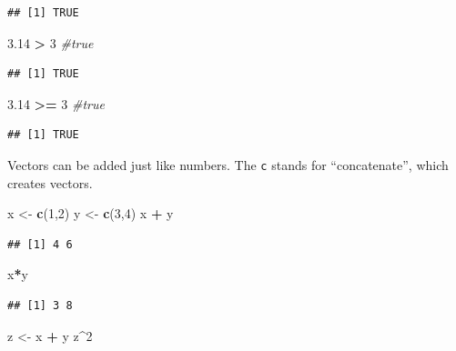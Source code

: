 \documentclass[openany]{book}
\newenvironment{Shaded}{\begin{snugshade}}{\end{snugshade}}
\newcommand{\CommentTok}[1]{\textcolor[rgb]{0.56,0.35,0.01}{\textit{#1}}}
\newcommand{\DecValTok}[1]{\textcolor[rgb]{0.00,0.00,0.81}{#1}}
\newcommand{\FloatTok}[1]{\textcolor[rgb]{0.00,0.00,0.81}{#1}}
\newcommand{\KeywordTok}[1]{\textcolor[rgb]{0.13,0.29,0.53}{\textbf{#1}}}
\newcommand{\NormalTok}[1]{#1}
\newcommand{\OperatorTok}[1]{\textcolor[rgb]{0.81,0.36,0.00}{\textbf{#1}}}
\newcommand{\StringTok}[1]{\textcolor[rgb]{0.31,0.60,0.02}{#1}}
\begin{document}
\begin{verbatim}
## [1] TRUE
\end{verbatim}

\begin{Shaded}
\begin{Highlighting}[]
\FloatTok{3.14} \OperatorTok{>}\StringTok{ }\DecValTok{3} \CommentTok{#true}
\end{Highlighting}
\end{Shaded}

\begin{verbatim}
## [1] TRUE
\end{verbatim}

\begin{Shaded}
\begin{Highlighting}[]
\FloatTok{3.14} \OperatorTok{>=}\StringTok{ }\DecValTok{3} \CommentTok{#true}
\end{Highlighting}
\end{Shaded}

\begin{verbatim}
## [1] TRUE
\end{verbatim}

Vectors can be added just like numbers. The \texttt{c} stands for ``concatenate'', which creates vectors.

\begin{Shaded}
\begin{Highlighting}[]
\NormalTok{x <-}\StringTok{ }\KeywordTok{c}\NormalTok{(}\DecValTok{1}\NormalTok{,}\DecValTok{2}\NormalTok{)}
\NormalTok{y <-}\StringTok{ }\KeywordTok{c}\NormalTok{(}\DecValTok{3}\NormalTok{,}\DecValTok{4}\NormalTok{)}
\NormalTok{x }\OperatorTok{+}\StringTok{ }\NormalTok{y}
\end{Highlighting}
\end{Shaded}

\begin{verbatim}
## [1] 4 6
\end{verbatim}

\begin{Shaded}
\begin{Highlighting}[]
\NormalTok{x}\OperatorTok{*}\NormalTok{y}
\end{Highlighting}
\end{Shaded}

\begin{verbatim}
## [1] 3 8
\end{verbatim}

\begin{Shaded}
\begin{Highlighting}[]
\NormalTok{z <-}\StringTok{ }\NormalTok{x }\OperatorTok{+}\StringTok{ }\NormalTok{y}
\NormalTok{z}\OperatorTok{^}\DecValTok{2}
\end{Highlighting}
\end{Shaded}
\end{document}
